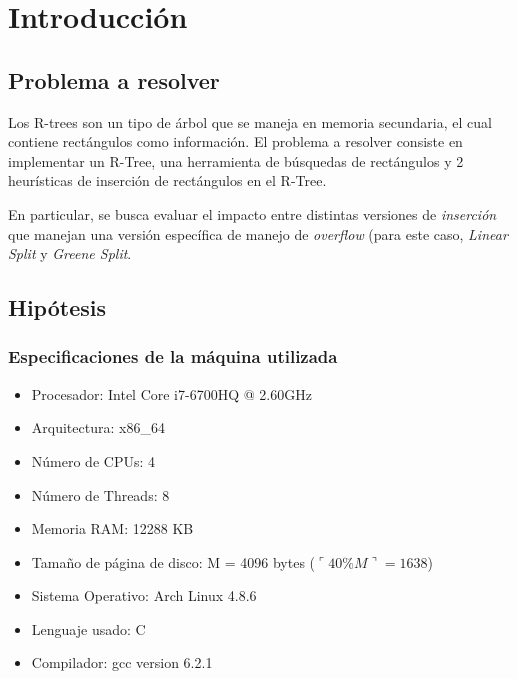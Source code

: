 \documentclass[letterpaper,10pt]{article}
\begin{document}
	\newpage

	\section{Introducción}

	\subsection{Problema a resolver}

	Los R-trees son un tipo de árbol que se maneja en memoria secundaria, el cual contiene rectángulos como información. El problema a resolver consiste en implementar un R-Tree,
	una herramienta de búsquedas de rectángulos y 2 heurísticas de inserción de rectángulos en el R-Tree.

	En particular, se busca evaluar el impacto entre distintas versiones de \textit{inserción} que manejan una versión específica de manejo de \textit{overflow} (para este caso,
	\textit{Linear Split} y \textit{Greene Split}.

	\subsection{Hipótesis}

	\subsubsection*{Especificaciones de la máquina utilizada}

	\begin{itemize}
		\item Procesador: Intel \textregistered Core \textregistered i7-6700HQ @ 2.60GHz
		\item Arquitectura: x86\_64
		\item Número de CPUs: 4
		\item Número de Threads: 8
		\item Memoria RAM: 12288 KB
		\item Tamaño de página de disco: M = 4096 bytes ($\ulcorner40\% M\urcorner = 1638$)
		\item Sistema Operativo: Arch Linux 4.8.6
		\item Lenguaje usado: C
		\item Compilador: gcc version 6.2.1
	\end{itemize}
\end{document}

